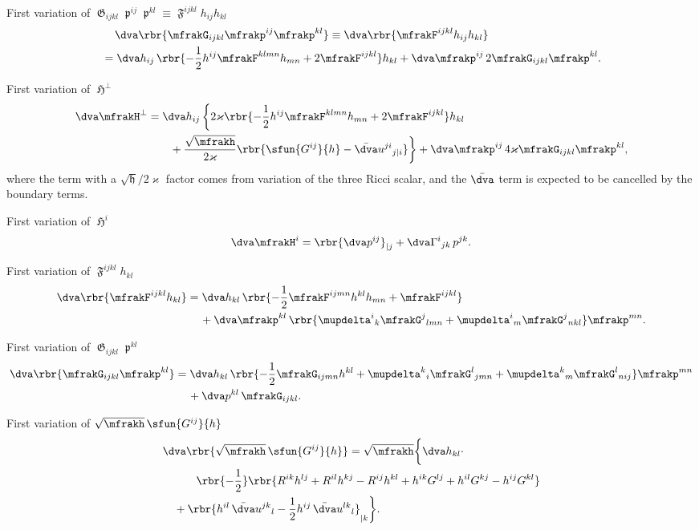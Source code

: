 \documentclass[a4paper,11pt]{article}
\begin{document}
First variation of $\mfrakG_{ijkl}\mfrakp^{ij}\mfrakp^{kl} \equiv
\mfrakF^{ijkl}h_{ij}h_{kl}$
\begin{align}
&\quad\,\dva\rbr{ \mfrakG_{ijkl} \mfrakp^{ij}\mfrakp^{kl}}
\equiv \dva\rbr{\mfrakF^{ijkl}h_{ij}h_{kl}}
\nonumber \\
&=\dva h_{ij}\,\rbr{-\frac{1}{2} h^{ij} \mfrakF^{klmn} h_{mn}
+ 2 \mfrakF^{ijkl} } h_{kl} 
+\dva \mfrakp^{ij}\,2 \mfrakG_{ijkl}\mfrakp^{kl}.
\end{align}

First variation of $\mfrakH^\perp$
\begin{align}
\dva \mfrakH^\perp &= \dva h_{ij}\,\bigg\{
2\varkappa \rbr{ -\frac{1}{2}h^{ij} \mfrakF^{klmn} h_{mn}
+ 2 \mfrakF^{ijkl} } h_{kl}
\nonumber \\
&\qquad
+\frac{\sqrt{\mfrakh}}{2\varkappa}\rbr{\sfun{G^{ij}}{h}
-\bar{\dva}u^{ji}{}_{j|i}} \bigg\}
+\dva \mfrakp^{ij}\,4\varkappa \mfrakG_{ijkl}\mfrakp^{kl},
\end{align}
where the term with a $\sqrt{\mfrakh}/2\varkappa$ factor comes from variation 
of the three Ricci scalar, and the $\bar{\dva}$ term is expected to be cancelled 
by the boundary terms.

First variation of $\mfrakH^i$
\begin{align}
\dva \mfrakH^i = \rbr{\dva p^{ij}}_{|j}
+ \dva\Gamma^{i}{}_{jk}\,p^{jk}.
\end{align}

First variation of $\mfrakF^{ijkl}h_{kl}$
\begin{align}
\dva\rbr{\mfrakF^{ijkl}h_{kl}} &= \dva h_{kl}\,
\rbr{-\frac{1}{2}\mfrakF^{ijmn}h^{kl}h_{mn}+\mfrakF^{ijkl}}
\nonumber \\
&\quad\,
+\dva \mfrakp^{kl}\,\rbr{
\mupdelta^{i}{}_{k}\mfrakG^{j}{}_{lmn} +
\mupdelta^{i}{}_{m}\mfrakG^{j}{}_{nkl}}\mfrakp^{mn}.
\end{align}

First variation of $\mfrakG_{ijkl}\mfrakp^{kl}$
\begin{align}
\dva\rbr{\mfrakG_{ijkl}\mfrakp^{kl}} &= \dva h_{kl}\,
\rbr{-\frac{1}{2}\mfrakG_{ijmn}h^{kl}+
\mupdelta^{k}{}_{i}\mfrakG^{l}{}_{jmn}+
\mupdelta^{k}{}_{m}\mfrakG^{l}{}_{nij}}\mfrakp^{mn}
\nonumber \\
&\quad\,
+\dva p^{kl}\,\mfrakG_{ijkl}.
\end{align}

First variation of $\sqrt{\mfrakh}\,\sfun{G^{ij}}{h}$
\begin{align}
&
\dva\rbr{\sqrt{\mfrakh}\,\sfun{G^{ij}}{h}}
= \sqrt{\mfrakh}\bigg\{\dva h_{kl}\cdot
\nonumber \\
&\qquad\quad
\rbr{-\frac{1}{2}}\rbr{
R^{ik}h^{lj}+R^{il}h^{kj}-R^{ij}h^{kl}+h^{ik}G^{lj}+h^{il}G^{kj}-h^{ij}G^{kl}}
\nonumber \\
&\quad
+\rbr{h^{il}\,\bar{\dva}u^{jk}{}_{l}
- \frac{1}{2}h^{ij}\,\bar{\dva}u^{lk}{}_{l}}_{|k} \bigg\}.
\end{align}
\end{document}
